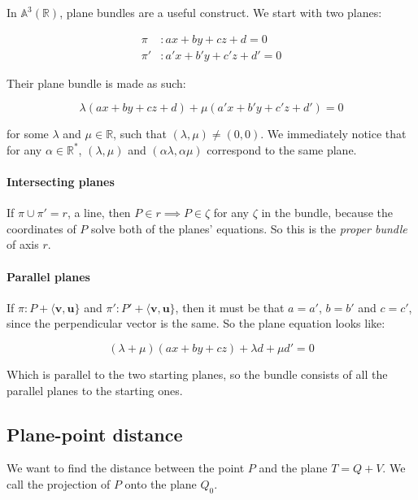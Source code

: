 \documentclass[12pt,a4paper]{report}
\numberwithin{equation}{section}
\theoremstyle{definition}
\theoremstyle{remark}
\begin{document}
In $\mathbb{A}^3 (\mathbb{R})$, plane bundles are a useful construct. We start with two planes:

\begin{align}
\pi &: ax + by + cz + d=0\\
\pi ' &: a'x+b'y+c'z+d'=0
\end{align}

Their plane bundle is made as such:

\begin{equation}
\lambda (ax + by + cz + d ) + \mu (a'x+b'y+c'z+d')=0
\end{equation}

for some $\lambda$ and $\mu \in \mathbb{R}$, such that $(\lambda, \mu) \neq (0, 0)$.
We immediately notice that for any $\alpha \in \mathbb{R}^*$, $(\lambda, \mu)$ and $(\alpha \lambda, \alpha \mu)$ correspond to the same plane.

\paragraph{Intersecting planes} If $\pi \cup \pi' = r$, a line, then $P \in r \implies P \in \zeta$ for any $\zeta$ in the bundle, because the coordinates of $P$ solve both of the planes' equations. So this is the \emph{proper bundle} of axis $r$.

\paragraph{Parallel planes} If $\pi: P + \langle \mathbf{v}, \mathbf{u}\rbrace$ and $\pi': P' + \langle \mathbf{v}, \mathbf{u}\rbrace$, then it must be that $a = a'$, $b=b'$ and  $c=c'$, since the perpendicular vector is the same. So the plane equation looks like:

\begin{equation}
(\lambda + \mu ) (ax + by+ cz) + \lambda d + \mu d'=0
\end{equation}

Which is parallel to the two starting planes, so the bundle consists of all the parallel planes to the starting ones.

\subsection{Plane-point distance}

We want to find the distance between the point $P$ and the plane $T = Q + V$. We call the projection of $P$ onto the plane $Q_0$.
\end{document}
